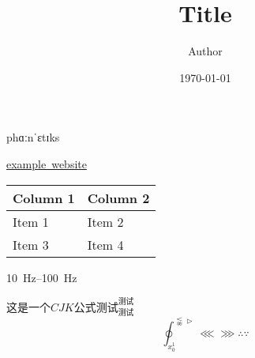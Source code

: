 \documentclass{article}
\title{Title}
\author{Author}
\date{\today}
\begin{document}
    \maketitle
    phɑːnˈɛtɪks
    
    \href{www.example.com}{example\ website}

    \begin{tabu} to 1\textwidth {X[2,l]X[1,r]}
        Column 1 & Column 2 \\
        \hline
        Item 1 & Item 2 \\
        Item 3 & Item 4 \\
    \end{tabu}

    \SIrange{10}{100}{\hertz}

    $这是一个CJK公式测试^{测试}_{测试}$
    \[\oint_{x_0^1}^{\lnapprox \vartriangleright}\lll \ggg \therefore \because  \]
\end{document}
